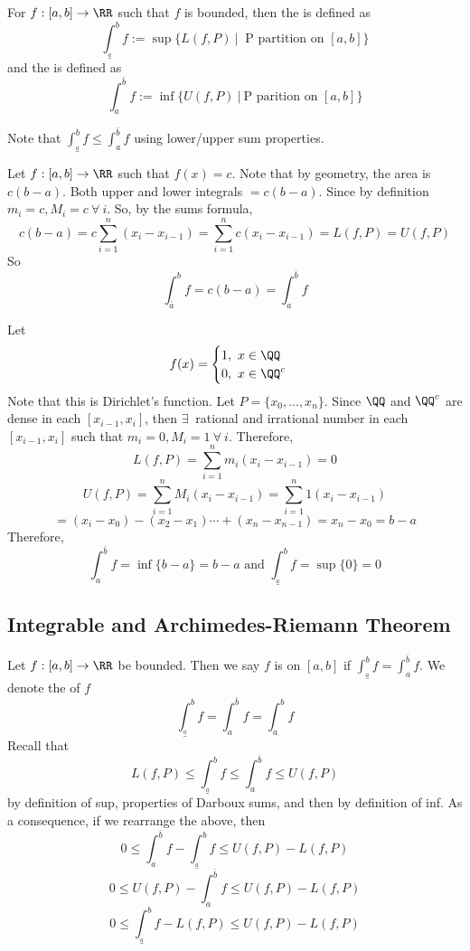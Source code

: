 \documentclass[12pt]{scrartcl}
\newcommand{\lint}{\int_{\overset{a}{\_}}^{b}}
\newcommand{\uint}{\int_a^{\bar{b}}}
\begin{document}
\begin{definition}
  For $f: [a,b] \to \RR$ such that $f$ is bounded, then 
  the  is defined as 
  \[\int_{\overset{a}{\_}}^b f := \sup\{L(f, P) \ | \ \text{ P partition on } [a,b]\}\]
  and the  is defined as 
  \[\int_a^{\bar{b}} f := \inf\{U(f, P) \ | \ \text{P parition on } [a,b]\}\]
\end{definition}

\begin{lemma}
  Note that $\int_{\overset{a}{\_}}^b f \leq \int_a^{\bar{b}} f$ using 
  lower/upper sum properties.
\end{lemma}

\begin{example}
  Let $f: [a,b] \to \RR$ such that $f(x) = c$.
  Note that by geometry, the area is $c(b-a)$. Both upper 
  and lower integrals $= c(b-a)$. Since by definition
  $m_i = c, M_i = c \ \forall \ i$. So, by the sums formula, 
  \[c(b-a) = c \sum_{i=1}^n (x_i - x_{i-1}) = \sum_{i=1}^n c(x_i - x_{i-1}) = L(f, P) = U(f,P)\] 
  So
  \[\int_{\overset{\_}{a}}^b f = c(b-a) = \int_a^{\bar{b}} f\]
\end{example}

\begin{example}
  Let
  \[f(x) = \begin{cases}
    1, \ x \in \QQ\\
    0, \ x \in \QQ^c
  \end{cases}\]
  Note that this is Dirichlet's function. Let $P = \{x_0, \ldots, x_n\}$. 
  Since $\QQ$ and $\QQ^c$ are dense in each $[x_{i-1}, x_i]$, 
  then $\exists \ $ rational and irrational number in each $[x_{i-1}, x_i]$
  such that $m_i = 0, M_i = 1 \ \forall \ i$. Therefore, 
  \[L(f, P) = \sum_{i=1}^n m_i(x_i - x_{i-1}) = 0\]
  \[U(f, P) = \sum_{i=1}^n M_i (x_i - x_{i-1}) = \sum_{i=1}^n 1 (x_i - x_{i-1})\]
  \[= (x_i - x_0) - (x_2 - x_1) \cdots + (x_n - x_{n-1}) = x_n - x_0 = b - a\]
  Therefore, 
  \[\int_a^{\bar{b}} f = \inf\{b-a\} = b-a \text{ and } \int_{\overset{a}{\_}}^b f = \sup\{0\} = 0\]
\end{example}

\subsection{Integrable and Archimedes-Riemann Theorem}

\begin{definition}
  Let $f: [a,b] \to \RR$ be bounded. Then we say $f$ is 
   on $[a,b]$ if $\lint f = \uint f$. 
  We denote the  of $f$ 
  \[\int_{\overset{a}{\_}}^b f = \int_a^{\bar{b}} f = \int_a^b f\]
  Recall that 
  \[L(f, P) \leq \lint f \leq \uint f \leq U(f, P)\]
  by definition of sup, properties of Darboux sums, and then by definition of inf. 
  As a consequence, if we rearrange the above, then 
  \[0 \leq \uint f - \lint f \leq U(f, P) - L(f, P)\]
  \[0 \leq U(f, P) - \uint f \leq U(f, P) - L(f, P)\]
  \[0 \leq \lint f - L(f,P) \leq U(f, P) - L(f, P)\]
\end{definition}
\end{document}
